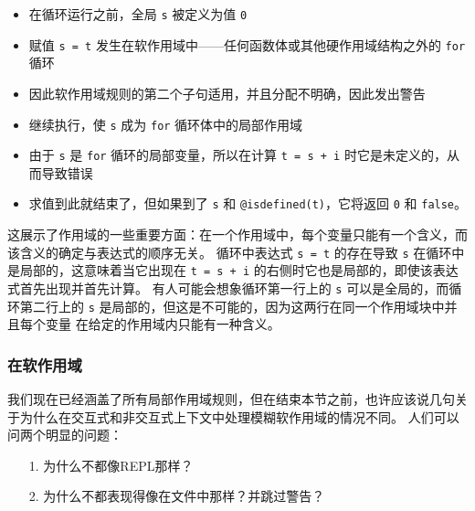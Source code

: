 \begin{itemize}
\item 在循环运行之前，全局 \texttt{s} 被定义为值 \texttt{0}


\item 赋值 \texttt{s = t} 发生在软作用域中——任何函数体或其他硬作用域结构之外的 \texttt{for} 循环


\item 因此软作用域规则的第二个子句适用，并且分配不明确，因此发出警告


\item 继续执行，使 \texttt{s} 成为 \texttt{for} 循环体中的局部作用域


\item 由于 \texttt{s} 是 \texttt{for} 循环的局部变量，所以在计算 \texttt{t = s + i} 时它是未定义的，从而导致错误


\item 求值到此就结束了，但如果到了 \texttt{s} 和 \texttt{@isdefined(t)}，它将返回 \texttt{0} 和 \texttt{false}。

\end{itemize}


这展示了作用域的一些重要方面：在一个作用域中，每个变量只能有一个含义，而该含义的确定与表达式的顺序无关。 循环中表达式 \texttt{s = t} 的存在导致 \texttt{s} 在循环中是局部的，这意味着当它出现在 \texttt{t = s + i} 的右侧时它也是局部的，即使该表达式首先出现并首先计算。 有人可能会想象循环第一行上的 \texttt{s} 可以是全局的，而循环第二行上的 \texttt{s} 是局部的，但这是不可能的，因为这两行在同一个作用域块中并且每个变量 在给定的作用域内只能有一种含义。



\hypertarget{3860142823548396729}{}


\subsubsection{在软作用域}



我们现在已经涵盖了所有局部作用域规则，但在结束本节之前，也许应该说几句关于为什么在交互式和非交互式上下文中处理模糊软作用域的情况不同。 人们可以问两个明显的问题：



\begin{itemize}
\item[1. ] 为什么不都像REPL那样？


\item[2. ] 为什么不都表现得像在文件中那样？并跳过警告？

\end{itemize}


